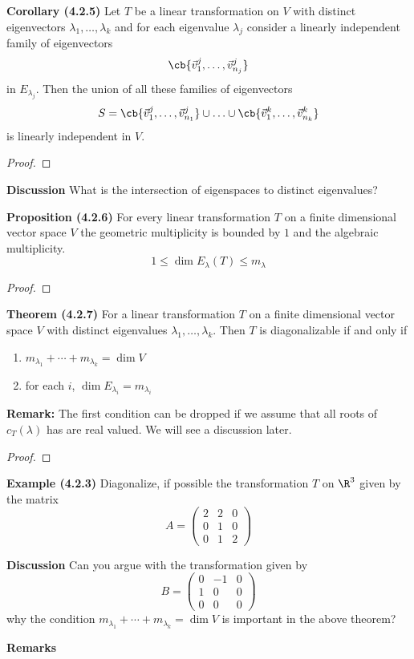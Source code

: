 \documentclass[letterpaper, 10pt]{article}
\begin{document}
\newpage
\lb
\textbf{Corollary (4.2.5)}
\lb
Let $T$ be a linear transformation on $V$ with distinct eigenvectors $λ_1, \ldots, λ_k$ and for
each eigenvalue $λ_j$ consider a linearly independent family of eigenvectors
\[ \cb{\vec v_1^j, \ldots, \vec v_{n_j}^j} \]
in $E_{λ_j}$.
Then the union of all these families of eigenvectors 
\[ S = \cb{\vec v_1^j, \ldots, \vec v_{n_1}^j} \cup \ldots
\cup \cb{\vec v_1^k, \ldots, \vec v_{n_k}^k} \]
is linearly independent in $V$.
\begin{proof}
\end{proof}


\vspace{300pt}
\lb
\textbf{Discussion}
\lb
What is the intersection of eigenspaces to distinct eigenvalues?


\newpage
\lb
\textbf{Proposition (4.2.6)}
\lb
For every linear transformation $T$ on a finite dimensional vector space $V$ the geometric 
multiplicity is bounded by $1$ and the algebraic multiplicity.
\[ 1 \leq \dim{E_λ}(T) \leq m_λ \]
\begin{proof}
\end{proof}

\vspace{200pt}
\lb
\textbf{Theorem (4.2.7)}
\lb
For a linear transformation $T$ on a finite dimensional vector space $V$
with distinct eigenvalues $λ_1, \ldots, λ_k$.
Then $T$ is diagonalizable if and only if
\begin{enumerate}
    \item $m_{λ_1} + \cdots + m_{λ_k} = \dim{V}$
    \item for each $i$, $\dim{E_{λ_i}} = m_{λ_i}$
\end{enumerate}
\textbf{Remark:} The first condition can be dropped if we assume that all roots of $c_T(λ)$ has
are real valued. We will see a discussion later.
\begin{proof}
\end{proof}


\newpage
\lb
\textbf{Example (4.2.3)}
\lb
Diagonalize, if possible the transformation $T$ on $\R^3$ given by the matrix
\[ A = \begin{pmatrix}
    2 & 2 & 0 \\
    0 & 1 & 0 \\
    0 & 1 & 2
\end{pmatrix}
\]




\vspace{300pt}
\lb
\textbf{Discussion}
\lb
Can you argue with the transformation given by
\[ B = \begin{pmatrix}
    0 & -1 & 0 \\
    1 & 0 & 0 \\
    0 & 0 & 0
\end{pmatrix}
\]
why the condition $m_{λ_1} + \cdots + m_{λ_k} = \dim{V}$ is important in the above theorem?



\newpage
\lb
\textbf{Remarks}
\lb
\end{document}
